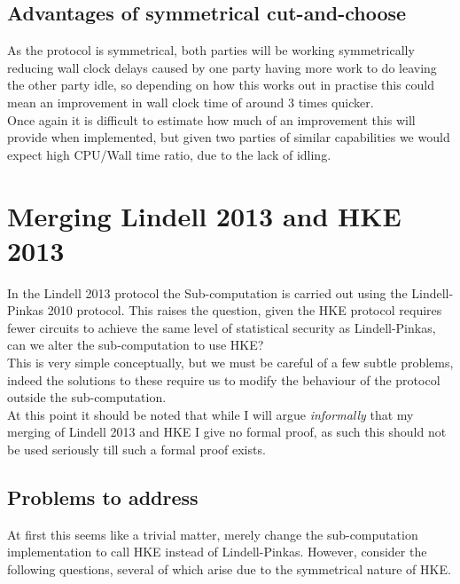 \documentclass[ %
                    author={Nicholas Tutte},
                supervisor={Prof. Nigel Smart},
                    degree={MEng},
                     title={Secure Two Party Computation},
                  subtitle={A practical comparison of recent protocols},
                      type={Research - GG1K},
                      year={2015} ]{dissertation}
\begin{document}
				

			\subsection{Advantages of symmetrical cut-and-choose}
				As the protocol is symmetrical, both parties will be working symmetrically reducing wall clock delays caused by one party having more work to do leaving the other party idle, so depending on how this works out in practise this could mean an improvement in wall clock time of around $3$ times quicker.\\

				Once again it is difficult to estimate how much of an improvement this will provide when implemented, but given two parties of similar capabilities we would expect high CPU/Wall time ratio, due to the lack of idling.


		\section{Merging Lindell 2013 and HKE 2013}
			In the Lindell 2013 protocol the Sub-computation is carried out using the Lindell-Pinkas 2010 protocol. This raises the question, given the HKE protocol requires fewer circuits to achieve the same level of statistical security as Lindell-Pinkas, can we alter the sub-computation to use HKE?\\

			This is very simple conceptually, but we must be careful of a few subtle problems, indeed the solutions to these require us to modify the behaviour of the protocol outside the sub-computation.\\

			At this point it should be noted that while I will argue \emph{informally} that my merging of Lindell 2013 and HKE I give no formal proof, as such this should not be used seriously till such a formal proof exists.

			\subsection{Problems to address}
				At first this seems like a trivial matter, merely change the sub-computation implementation to call HKE instead of Lindell-Pinkas. However, consider the following questions, several of which arise due to the symmetrical nature of HKE.
\end{document}
